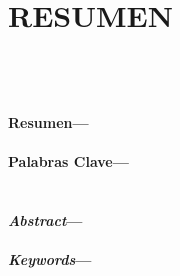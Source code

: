\newpage
\section*{RESUMEN}
\ \\ \ \\ \ \\
\noindent \textbf{Resumen---}\resumen \ \\
\ \\
\noindent \textbf{Palabras Clave---}\palabrasclave \ \\
\noindent {\fontsize{16}{19}\selectfont \ \\ \ \\}
\ \\ \ \\
\noindent \textbf{\emph{Abstract}---}\resumeningles \ \\
\ \\
\noindent \textbf{\emph{Keywords}---}\palabrasclaveingles \ \\

